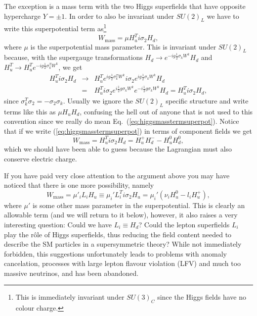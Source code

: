 \documentclass[notes.tex]{subfiles}
\begin{document}
The exception is a mass term with the two Higgs superfields that have opposite hypercharge $Y=\pm1$. In order to also be invariant under $SU(2)_L$ we have to write this superpotential term as\footnote{This is immediately invariant under $SU(3)_C$ since the Higgs fields have no colour charge.}
\begin{equation}
W_\text{mass}=\mu H^T_ui\sigma_2 H_d,
\label{eq:higgsmasstermsuperpot}
\end{equation}
where $\mu$ is the superpotential mass parameter. This is invariant under $SU(2)_L$ because, with the supergauge transformations $H_d \to e^{-ig\frac{1}{2}\sigma_kW^k}H_d$ and $H^T_u \to H^T_u e^{-ig\frac{1}{2}\sigma^T_kW^k}$, we get
\begin{eqnarray*}
H_u^T i\sigma_2 H_d &\to& H_u^T e^{ig\frac{1}{2}\sigma_k^TW^k}i\sigma_2 e^{ig\frac{1}{2}\sigma_k W^k}H_d\\
 &=& H_u^T i\sigma_2e^{i\frac{1}{2}g\sigma_kW^k}e^{-i\frac{1}{2}g\sigma_kW^k}H_d = H_u^T i\sigma_2 H_d,
\end{eqnarray*}
since $\sigma_k^T\sigma_2 = -\sigma_2\sigma_k$. Usually we ignore the $SU(2)_L$ specific structure and write terms like  this as $\mu H_u H_d$, confusing the hell out of anyone that is not used to this convention since we really do mean Eq.~(\ref{eq:higgsmasstermsuperpot}). Notice that if we write (\ref{eq:higgsmasstermsuperpot}) in terms of component fields we get
\[W_\text{mass}=H_u^Ti\sigma_2 H_d = H_u^+ H_d^- - H_u^0 H_d^0,\]
which we should have been able to guess because the Lagrangian must also conserve electric charge.

If you have paid very close attention to the argument above you may have noticed that there is one more possibility, namely
\[W_\text{mass}=\mu'_i L_iH_u \equiv \mu_i' L_i^T i\sigma_2 H_u = \mu_i'(\nu_i H_u^0 - l_iH_u^+),\]
where $\mu'$ is some other mass parameter in the superpotential. This is clearly an allowable term (and we will return to it below), however, it also raises a very interesting question: Could we have $L_i\equiv H_d$? Could the lepton superfields $L_i$ play the r\^ole of Higgs superfields, thus reducing the field content needed to describe the SM particles in a supersymmetric theory? While not immediately forbidden, this suggestions unfortunately leads to problems with anomaly cancelation, processes with large lepton flavour violation (LFV) and much too massive neutrinos, and has been abandoned.
\end{document}
